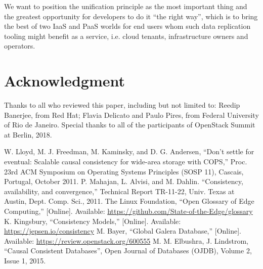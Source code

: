 \documentclass[conference]{IEEEtran}
\begin{document}
We want to position the unification principle as the most important thing and
the greatest opportunity for developers to do it ``the right way'', which is to
bring the best of two IaaS and PaaS worlds for end users whom such data
replication tooling might benefit as a service, i.e. cloud tenants,
infrastructure owners and operators.

\section*{Acknowledgment}

Thanks to all who reviewed this paper, including but not limited to:
Reedip Banerjee, from Red Hat; Flavia Delicato and Paulo Pires, from Federal
University of Rio de Janeiro. Special thanks to all of the participants of
OpenStack Summit at Berlin, 2018.

\begin{thebibliography}{00}
 W. Lloyd, M. J. Freedman, M. Kaminsky, and D. G. Andersen, ``Don’t settle for eventual: Scalable causal consistency for wide-area storage with COPS,'' Proc. 23rd ACM Symposium on Operating Systems Principles (SOSP 11), Cascais, Portugal, October 2011.
 P. Mahajan, L. Alvisi, and M. Dahlin. ``Consistency, availability, and convergence,'' Technical Report TR-11-22, Univ. Texas at Austin, Dept. Comp. Sci., 2011.
 The Linux Foundation, ``Open Glossary of Edge Computing,'' [Online]. Available: \url{https://github.com/State-of-the-Edge/glossary}
 K. Kingsbury, ``Consistency Models,'' [Online]. Available: \url{https://jepsen.io/consistency}
 M. Bayer, ``Global Galera Database,'' [Online]. Available: \url{https://review.openstack.org/600555}
 M. M. Elbushra, J. Lindstrom, ``Causal Consistent Databases'', Open Journal of Databases (OJDB), Volume 2, Issue 1, 2015.
\end{thebibliography}
\end{document}
